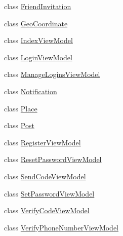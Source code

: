 \begin{DoxyCompactItemize}
\item 
class \hyperlink{class_bibabook_1_1_models_1_1_friend_invitation}{Friend\+Invitation}
\item 
class \hyperlink{class_bibabook_1_1_models_1_1_geo_coordinate}{Geo\+Coordinate}
\item 
class \hyperlink{class_bibabook_1_1_models_1_1_index_view_model}{Index\+View\+Model}
\item 
class \hyperlink{class_bibabook_1_1_models_1_1_login_view_model}{Login\+View\+Model}
\item 
class \hyperlink{class_bibabook_1_1_models_1_1_manage_logins_view_model}{Manage\+Logins\+View\+Model}
\item 
class \hyperlink{class_bibabook_1_1_models_1_1_notification}{Notification}
\item 
class \hyperlink{class_bibabook_1_1_models_1_1_place}{Place}
\item 
class \hyperlink{class_bibabook_1_1_models_1_1_post}{Post}
\item 
class \hyperlink{class_bibabook_1_1_models_1_1_register_view_model}{Register\+View\+Model}
\item 
class \hyperlink{class_bibabook_1_1_models_1_1_reset_password_view_model}{Reset\+Password\+View\+Model}
\item 
class \hyperlink{class_bibabook_1_1_models_1_1_send_code_view_model}{Send\+Code\+View\+Model}
\item 
class \hyperlink{class_bibabook_1_1_models_1_1_set_password_view_model}{Set\+Password\+View\+Model}
\item 
class \hyperlink{class_bibabook_1_1_models_1_1_verify_code_view_model}{Verify\+Code\+View\+Model}
\item 
class \hyperlink{class_bibabook_1_1_models_1_1_verify_phone_number_view_model}{Verify\+Phone\+Number\+View\+Model}
\end{DoxyCompactItemize}
